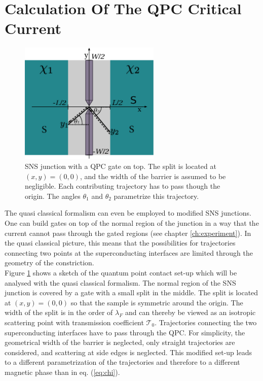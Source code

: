 \section{Calculation Of The QPC Critical Current}
\begin{figure}
\centering
\includegraphics[width=0.6\textwidth]{figure/analyticalmodel/qpc_sns_junction_csch}
\caption{SNS junction with a QPC gate on top. The split is located at $(x, y) = (0, 0)$, and the width of the barrier is assumed to be negligible. Each contributing trajectory has to pass though the origin. The angles $\theta_1$ and $\theta_2$ parametrize this trajectory.}
\label{fig:qpc_sns_schematic}
\end{figure}
The quasi classical formalism can even be employed to modified SNS junctions. One can build gates on top of the normal region of the junction in a way that the current cannot pass through the gated regions (see chapter \ref{ch:experiment}). In the quasi classical picture, this means that the possibilities for trajectories connecting two points at the superconducting interfaces are limited through the geometry of the constriction.\\
Figure \ref{fig:qpc_sns_schematic} shows a sketch of the quantum point contact set-up which will be analysed with the quasi classical formalism. The normal region of the SNS junction is covered by a gate with a small split in the middle. The split is located at $(x, y) = (0, 0)$ so that the sample is symmetric around the origin. The width of the split is in the order of $\lambda_F$  and can thereby be viewed as an isotropic scattering point with transmission coefficient $\mathcal{T}_0$. Trajectories connecting the two superconducting interfaces have to pass through the QPC. For simplicity, the geometrical width of the barrier is neglected, only straight trajectories are considered, and scattering at side edges is neglected. This modified set-up leads to a different parametrization of the trajectories and therefore to a different magnetic phase than in eq. (\ref{eq:chi}).\\
